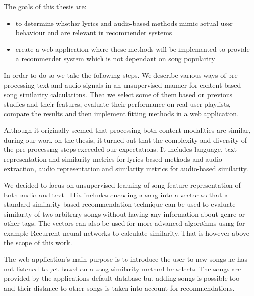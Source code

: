 The goals of this thesis are:
\begin{itemize}
    \item to determine whether lyrics and audio-based methods mimic actual user behaviour and are relevant in recommender systems
    \item create a web application where these methods will be implemented to provide a recommender system which is not dependant on song popularity
\end{itemize}

In order to do so we take the following steps. We describe various ways of pre-processing text and audio signals in an unsupervised manner for content-based song similarity calculations. Then we select some of them based on previous studies and their features, evaluate their performance on real user playlists, compare the results and then implement fitting methods in a web application.

Although it originally seemed that processing both content modalities are similar, during our work on the thesis, it turned out that the complexity and diversity of the pre-processing steps exceeded our expectations. It includes language, text representation and similarity metrics for lyrics-based methods and audio extraction, audio representation
and similarity metrics for audio-based similarity. 

We decided to focus on unsupervised learning of song feature representation of both audio and text. This includes encoding a song into a vector so that a standard similarity-based recommendation technique can be used to evaluate similarity of two arbitrary songs without having any information about genre or other tags. The vectors can also be used for more advanced algorithms using for example Recurrent neural networks to calculate similarity. That is however above the scope of this work. 

The web application's main purpose is to introduce the user to new songs he has not listened to yet based on a song similarity method he selects. The songs are provided by the applications default database but adding songs is possible too and their distance to other songs is taken into account for recommendations. 
